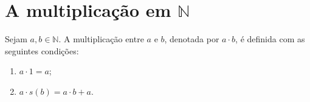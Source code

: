 \documentclass[../main.tex]{subfiles}
\begin{document}


\section{A multiplicação em $\mathbb{N}$}
\begin{defi}\label{nat-def-produto}
    Sejam $a, b \in \mathbb{N}$. A multiplicação entre $a$ e $b$, denotada por $a \cdot b$, é definida com as seguintes condições: 
	\begin{enumerate}[label=(\roman*)]
		\item $a \cdot 1 = a$;
		\item $a \cdot s(b) = a \cdot b + a$.
	\end{enumerate}
\end{defi}
\end{document}
